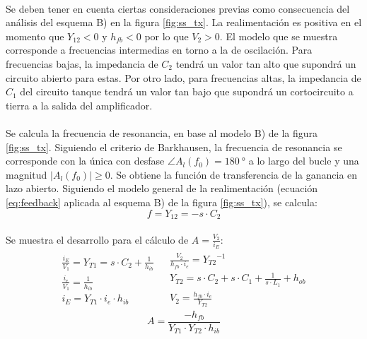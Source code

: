 \paragraph{}
Se deben tener en cuenta ciertas consideraciones previas como consecuencia del an\'alisis del esquema B) en la figura \ref{fig:ss_tx}. La realimentaci\'on es positiva en el momento que $Y_{12}<0$ y $h_{fb}<0$ por lo que $V_2>0$. El modelo que se muestra corresponde a frecuencias intermedias en torno a la de oscilaci\'on. Para frecuencias bajas, la impedancia de $C_2$ tendrá un valor tan alto que supondrá un circuito abierto para estas.
Por otro lado, para frecuencias altas, la impedancia de $C_1$ del circuito tanque tendr\'a un valor tan bajo que supondr\'a un cortocircuito a tierra a la salida del amplificador.
\paragraph{}
Se calcula la frecuencia de resonancia, en base al modelo B) de la figura \ref{fig:ss_tx}. Siguiendo el criterio de Barkhausen, la frecuencia de resonancia se corresponde con la única con desfase $\angle A_l(f_0) = \SI{180}{\degree}$ a lo largo del bucle y una magnitud $|A_l(f_0)|\ge 0$. Se obtiene la funci\'on de transferencia de la ganancia en lazo abierto.
Siguiendo el modelo general de la realimentaci\'on (ecuaci\'on \ref{eq:feedback} aplicada al esquema B) de la figura \ref{fig:ss_tx}), se calcula: 
\begin{equation}
f = Y_{12} = -s \cdot C_2
\end{equation}
\paragraph{}
Se muestra el desarrollo para el c\'alculo de $A = \frac{V_2}{i_E}$:
\[
\begin{array}{rl} 
      \begin{array}{l}
   \frac{i_E}{V_1} = Y_{T1} = s\cdot C_2 + \frac{1}{h_{ib}} \\
   \frac{i_e}{V_{1}} = \frac{1}{h_{ib}} \\
   i_E = Y_{T1} \cdot i_e \cdot h_{ib}
      \end{array}
      &
      \begin{array}{r}
   \frac{V_2}{h_{fb}\cdot i_e} = {Y_{T2}}^{-1} \\
   Y_{T2} = s\cdot C_2 + s\cdot C_1 + \frac{1}{s\cdot L_1} + h_{ob} \\
   V_2 = \frac{h_{fb}\cdot i_e}{Y_{T2}} 
      \end{array}
\end{array}
\]
\begin{equation}
   A = \frac{-h_{fb}}{Y_{T1} \cdot Y_{T2} \cdot h_{ib}} 
\end{equation}
